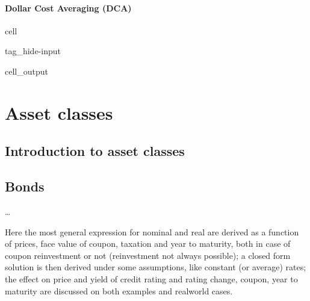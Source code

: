 \documentclass[letterpaper,10pt,english]{jupyterBook}
\begin{document}
\subsection{Dollar Cost Averaging (DCA)}
\label{\detokenize{code/notebooks/sequence-risk:dollar-cost-averaging-dca}}
\begin{sphinxuseclass}{cell}
\begin{sphinxuseclass}{tag_hide-input}\begin{sphinxVerbatimOutput}

\begin{sphinxuseclass}{cell_output}
\noindent{}

\end{sphinxuseclass}\end{sphinxVerbatimOutput}

\end{sphinxuseclass}
\end{sphinxuseclass}
\sphinxstepscope


\part{Asset classes}

\sphinxstepscope


\chapter{Introduction to asset classes}
\label{\detokenize{ch/assets/intro:introduction-to-asset-classes}}\label{\detokenize{ch/assets/intro:fin-edu-assets-intro}}\label{\detokenize{ch/assets/intro::doc}}
\sphinxstepscope


\chapter{Bonds}
\label{\detokenize{ch/assets/bonds:bonds}}\label{\detokenize{ch/assets/bonds:fin-edu-assets-bonds}}\label{\detokenize{ch/assets/bonds::doc}}
\sphinxAtStartPar
…

\sphinxAtStartPar
Here the most general expression for nominal and real  are derived as a function of prices, face value of coupon, taxation and year to maturity, both in case of coupon reinvestment or not (reinvestment not always possible); a closed form solution is then derived under some assumptions, like constant (or average) rates; the effect on price and yield of credit rating and rating change, coupon, year to maturity are discussed on both examples and real\sphinxhyphen{}world cases.
\end{document}
